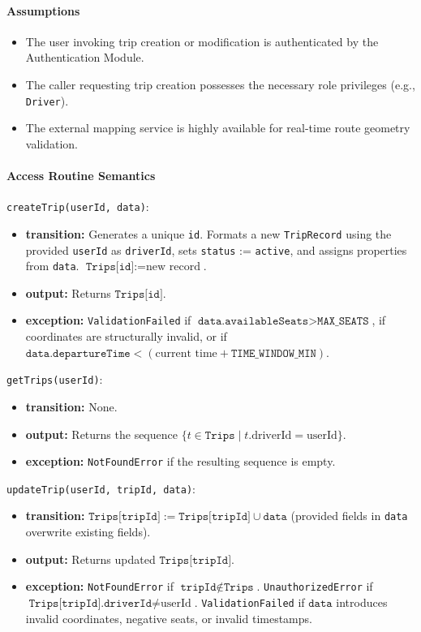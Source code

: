 \paragraph{Assumptions}
\begin{itemize}
    \item The user invoking trip creation or modification is authenticated by the Authentication Module.
    \item The caller requesting trip creation possesses the necessary role privileges (e.g., \texttt{Driver}).
    \item The external mapping service is highly available for real-time route geometry validation.
\end{itemize}

\paragraph{Access Routine Semantics}

\noindent \texttt{createTrip(userId, data)}:
\begin{itemize}
    \item \textbf{transition:} Generates a unique \texttt{id}. Formats a new \texttt{TripRecord} using the provided \texttt{userId} as \texttt{driverId}, sets \texttt{status} := \texttt{active}, and assigns properties from \texttt{data}. $\texttt{Trips[id]} := \text{new record}$.
    \item \textbf{output:} Returns $\texttt{Trips[id]}$.
    \item \textbf{exception:} \texttt{ValidationFailed} if $\texttt{data.availableSeats} > \texttt{MAX\_SEATS}$, if coordinates are structurally invalid, or if $\texttt{data.departureTime} < (\text{current time} + \texttt{TIME\_WINDOW\_MIN})$.
\end{itemize}

\noindent \texttt{getTrips(userId)}:
\begin{itemize}
    \item \textbf{transition:} None.
    \item \textbf{output:} Returns the sequence $\{ t \in \texttt{Trips} \mid t.\text{driverId} = \text{userId} \}$.
    \item \textbf{exception:} \texttt{NotFoundError} if the resulting sequence is empty.
\end{itemize}

\noindent \texttt{updateTrip(userId, tripId, data)}:
\begin{itemize}
    \item \textbf{transition:} $\texttt{Trips[tripId]} := \texttt{Trips[tripId]} \cup \texttt{data}$ (provided fields in \texttt{data} overwrite existing fields).
    \item \textbf{output:} Returns updated $\texttt{Trips[tripId]}$.
    \item \textbf{exception:} \texttt{NotFoundError} if $\texttt{tripId} \notin \texttt{Trips}$. \texttt{UnauthorizedError} if $\texttt{Trips[tripId].driverId} \neq \text{userId}$. \texttt{ValidationFailed} if $\texttt{data}$ introduces invalid coordinates, negative seats, or invalid timestamps.
\end{itemize}


